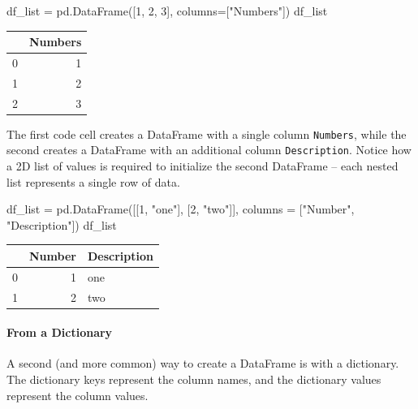 \documentclass[
  letterpaper,
  DIV=11,
  numbers=noendperiod]{scrreprt}
\let\oldparagraph\paragraph
\renewcommand{\paragraph}[1]{\oldparagraph{#1}\mbox{}}
\newenvironment{Shaded}{\begin{snugshade}}{\end{snugshade}}
\newcommand{\DecValTok}[1]{\textcolor[rgb]{0.68,0.00,0.00}{#1}}
\newcommand{\NormalTok}[1]{\textcolor[rgb]{0.00,0.23,0.31}{#1}}
\newcommand{\OperatorTok}[1]{\textcolor[rgb]{0.37,0.37,0.37}{#1}}
\newcommand{\StringTok}[1]{\textcolor[rgb]{0.13,0.47,0.30}{#1}}
\begin{document}
\begin{Shaded}
\begin{Highlighting}[]
\NormalTok{df\_list }\OperatorTok{=}\NormalTok{ pd.DataFrame([}\DecValTok{1}\NormalTok{, }\DecValTok{2}\NormalTok{, }\DecValTok{3}\NormalTok{], columns}\OperatorTok{=}\NormalTok{[}\StringTok{"Numbers"}\NormalTok{])}
\NormalTok{df\_list}
\end{Highlighting}
\end{Shaded}

\begin{tabular}{lr}
\toprule
{} &  Numbers \\
\midrule
0 &        1 \\
1 &        2 \\
2 &        3 \\
\bottomrule
\end{tabular}

The first code cell creates a DataFrame with a single column
\texttt{Numbers}, while the second creates a DataFrame with an
additional column \texttt{Description}. Notice how a 2D list of values
is required to initialize the second DataFrame -- each nested list
represents a single row of data.

\begin{Shaded}
\begin{Highlighting}[]
\NormalTok{df\_list }\OperatorTok{=}\NormalTok{ pd.DataFrame([[}\DecValTok{1}\NormalTok{, }\StringTok{"one"}\NormalTok{], [}\DecValTok{2}\NormalTok{, }\StringTok{"two"}\NormalTok{]], columns }\OperatorTok{=}\NormalTok{ [}\StringTok{"Number"}\NormalTok{, }\StringTok{"Description"}\NormalTok{])}
\NormalTok{df\_list}
\end{Highlighting}
\end{Shaded}

\begin{tabular}{lrl}
\toprule
{} &  Number & Description \\
\midrule
0 &       1 &         one \\
1 &       2 &         two \\
\bottomrule
\end{tabular}

\hypertarget{from-a-dictionary}{%
\paragraph{From a Dictionary}\label{from-a-dictionary}}

A second (and more common) way to create a DataFrame is with a
dictionary. The dictionary keys represent the column names, and the
dictionary values represent the column values.
\end{document}

